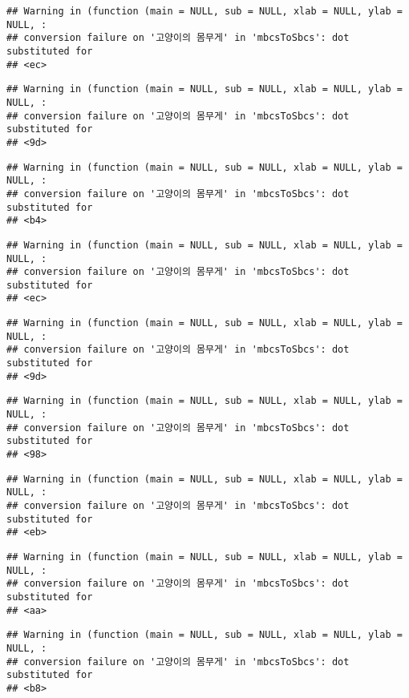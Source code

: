 \documentclass[
]{article}
\begin{document}
\begin{verbatim}
## Warning in (function (main = NULL, sub = NULL, xlab = NULL, ylab = NULL, :
## conversion failure on '고양이의 몸무게' in 'mbcsToSbcs': dot substituted for
## <ec>
\end{verbatim}

\begin{verbatim}
## Warning in (function (main = NULL, sub = NULL, xlab = NULL, ylab = NULL, :
## conversion failure on '고양이의 몸무게' in 'mbcsToSbcs': dot substituted for
## <9d>
\end{verbatim}

\begin{verbatim}
## Warning in (function (main = NULL, sub = NULL, xlab = NULL, ylab = NULL, :
## conversion failure on '고양이의 몸무게' in 'mbcsToSbcs': dot substituted for
## <b4>
\end{verbatim}

\begin{verbatim}
## Warning in (function (main = NULL, sub = NULL, xlab = NULL, ylab = NULL, :
## conversion failure on '고양이의 몸무게' in 'mbcsToSbcs': dot substituted for
## <ec>
\end{verbatim}

\begin{verbatim}
## Warning in (function (main = NULL, sub = NULL, xlab = NULL, ylab = NULL, :
## conversion failure on '고양이의 몸무게' in 'mbcsToSbcs': dot substituted for
## <9d>
\end{verbatim}

\begin{verbatim}
## Warning in (function (main = NULL, sub = NULL, xlab = NULL, ylab = NULL, :
## conversion failure on '고양이의 몸무게' in 'mbcsToSbcs': dot substituted for
## <98>
\end{verbatim}

\begin{verbatim}
## Warning in (function (main = NULL, sub = NULL, xlab = NULL, ylab = NULL, :
## conversion failure on '고양이의 몸무게' in 'mbcsToSbcs': dot substituted for
## <eb>
\end{verbatim}

\begin{verbatim}
## Warning in (function (main = NULL, sub = NULL, xlab = NULL, ylab = NULL, :
## conversion failure on '고양이의 몸무게' in 'mbcsToSbcs': dot substituted for
## <aa>
\end{verbatim}

\begin{verbatim}
## Warning in (function (main = NULL, sub = NULL, xlab = NULL, ylab = NULL, :
## conversion failure on '고양이의 몸무게' in 'mbcsToSbcs': dot substituted for
## <b8>
\end{verbatim}
\end{document}
